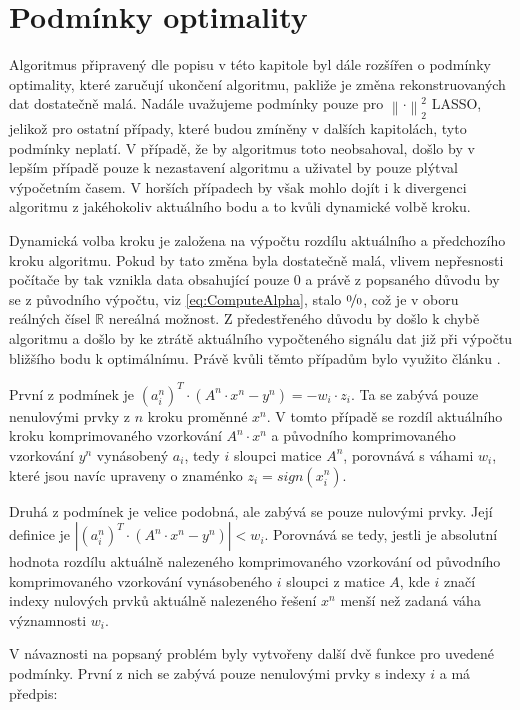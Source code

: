 \documentclass[FM,BP]{tulthesis}
\begin{document}
\section{Podmínky optimality}
\label{subch:stopCrit}
Algoritmus připravený dle popisu v této kapitole byl dále rozšířen o podmínky optimality, které zaručují ukončení algoritmu, pakliže je změna rekonstruovaných dat dostatečně malá. Nadále uvažujeme podmínky pouze pro $\left\| \cdot \right\|_{2}^{2} $ LASSO, jelikož pro ostatní případy, které budou zmíněny v dalších kapitolách, tyto podmínky neplatí. V případě, že by algoritmus toto neobsahoval, došlo by v lepším případě pouze k nezastavení algoritmu a uživatel by pouze plýtval výpočetním časem. V horších případech by však mohlo dojít i k divergenci algoritmu z jakéhokoliv aktuálního bodu a to kvůli dynamické volbě kroku. 

Dynamická volba kroku je založena na výpočtu rozdílu aktuálního a předchozího kroku algoritmu. Pokud by tato změna byla dostatečně malá, vlivem nepřesnosti počítače by tak vznikla data obsahující pouze $0$ a právě z popsaného důvodu by se z původního výpočtu, viz \ref{eq:ComputeAlpha}, stalo $\nicefrac{0}{0}$, což je v oboru reálných čísel $\mathbb{R}$ nereálná možnost. Z předestřeného důvodu by došlo k chybě algoritmu a došlo by ke ztrátě aktuálního vypočteného signálu dat již při výpočtu bližšího bodu k optimálnímu. Právě kvůli těmto případům bylo využito článku \cite{homotopy}.

První z podmínek je $(a_{i}^{n})^{T} \cdot (A^{n} \cdot x^{n} - y^{n}) = - w_{i} \cdot z_{i}$. Ta se zabývá pouze nenulovými prvky z $n$ kroku proměnné $x^{n}$. V tomto případě se rozdíl aktuálního kroku komprimovaného vzorkování $A^{n} \cdot x^{n}$ a původního komprimovaného vzorkování $y^{n}$ vynásobený $a_{i}$, tedy $i$ sloupci matice $A^{n}$, porovnává s váhami $w_{i}$, které jsou navíc upraveny o znaménko $z_{i} = sign(x_{i}^{n})$.

Druhá z podmínek je velice podobná, ale zabývá se pouze nulovými prvky. Její definice je $\left|(a_{i}^{n})^{T} \cdot (A^{n} \cdot x^{n} - y^{n})\right| < w_{i}$. Porovnává se tedy, jestli je absolutní hodnota rozdílu aktuálně nalezeného komprimovaného vzorkování od původního komprimovaného vzorkování vynásobeného $i$ sloupci z matice $A$, kde $i$ značí indexy nulových prvků aktuálně nalezeného řešení $x^{n}$ menší než zadaná váha významnosti $w_{i}$.

V návaznosti na popsaný problém byly vytvořeny další dvě funkce pro uvedené podmínky. První z nich se zabývá pouze nenulovými prvky s indexy $i$ a má předpis:
\end{document}
